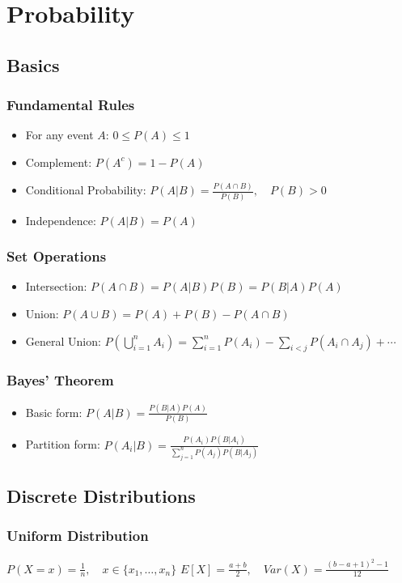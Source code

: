 \section{Probability}
\subsection*{Basics}
\subsubsection*{Fundamental Rules}
\begin{itemize}
\item For any event $A$: $0 \leq P(A) \leq 1$
\item Complement: $P(A^c) = 1 - P(A)$
\item Conditional Probability:
    $P(A|B) = \frac{P(A \cap B)}{P(B)}, \quad P(B) > 0$
\item Independence: $P(A|B) = P(A)$
\end{itemize}

\subsubsection*{Set Operations}
\begin{itemize}
\item Intersection:
    $P(A \cap B) = P(A|B)P(B) = P(B|A)P(A)$
\item Union:
    $P(A \cup B) = P(A) + P(B) - P(A \cap B)$
\item General Union:
    $P(\bigcup_{i=1}^n A_i) = \sum_{i=1}^n P(A_i) - \sum_{i<j} P(A_i \cap A_j) + \cdots$
\end{itemize}

\subsubsection*{Bayes' Theorem}
\begin{itemize}
\item Basic form:
    $P(A|B) = \frac{P(B|A)P(A)}{P(B)}$
\item Partition form:
    $P(A_i|B) = \frac{P(A_i)P(B|A_i)}{\sum_{j=1}^n P(A_j)P(B|A_j)}$
\end{itemize}

\subsection*{Discrete Distributions}

\subsubsection*{Uniform Distribution}
$P(X = x) = \frac{1}{n}, \quad x \in \{x_1, \ldots, x_n\}$
$E[X] = \frac{a + b}{2}, \quad Var(X) = \frac{(b-a+1)^2-1}{12}$

